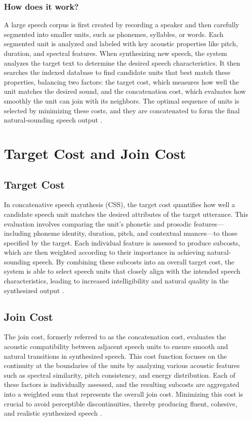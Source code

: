 \documentclass[10pt]{report}
\begin{document}
\subsection{How does it work?}
A large speech corpus is first created by recording a speaker and then carefully segmented into smaller units, such as phonemes, syllables, or words. Each segmented unit is analyzed and labeled with key acoustic properties like pitch, duration, and spectral features. When synthesizing new speech, the system analyzes the target text to determine the desired speech characteristics. It then searches the indexed database to find candidate units that best match these properties, balancing two factors: the target cost, which measures how well the unit matches the desired sound, and the concatenation cost, which evaluates how smoothly the unit can join with its neighbors. The optimal sequence of units is selected by minimizing these costs, and they are concatenated to form the final natural-sounding speech output \cite{kayte15}.

\chapter{Target Cost and Join Cost}
\section{Target Cost}
In concatenative speech synthesis (CSS), the target cost quantifies how well a candidate speech unit matches the desired attributes of the target utterance. This evaluation involves comparing the unit’s phonetic and prosodic features—including phoneme identity, duration, pitch, and contextual nuances—to those specified by the target. Each individual feature is assessed to produce subcosts, which are then weighted according to their importance in achieving natural-sounding speech. By combining these subcosts into an overall target cost, the system is able to select speech units that closely align with the intended speech characteristics, leading to increased intelligibility and natural quality in the synthesized output \cite{tom_backstrom_2022_6821775}.

\section{Join Cost}
The join cost, formerly referred to as the concatenation cost, evaluates the acoustic compatibility between adjacent speech units to ensure smooth and natural transitions in synthesized speech. This cost function focuses on the continuity at the boundaries of the units by analyzing various acoustic features such as spectral similarity, pitch consistency, and energy distribution. Each of these factors is individually assessed, and the resulting subcosts are aggregated into a weighted sum that represents the overall join cost. Minimizing this cost is crucial to avoid perceptible discontinuities, thereby producing fluent, cohesive, and realistic synthesized speech \cite{tom_backstrom_2022_6821775}.


\end{document}
